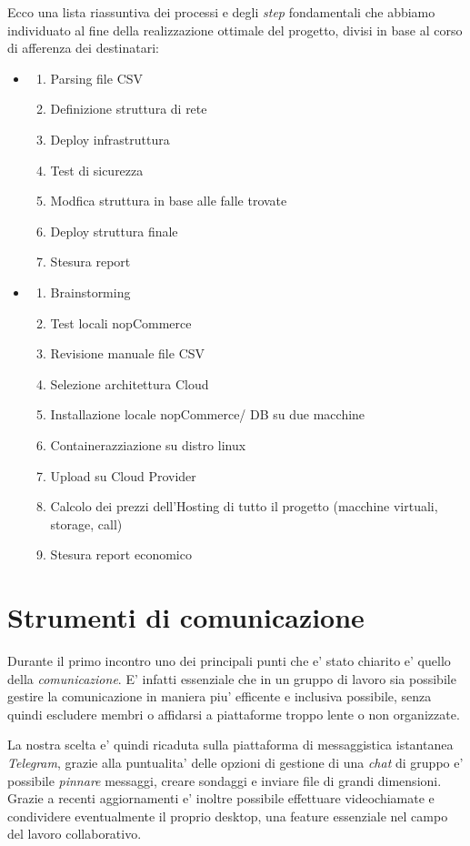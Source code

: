 \documentclass[a4paper]{report}
\begin{document}
	Ecco una lista riassuntiva dei processi e degli \emph{step} fondamentali che abbiamo individuato al fine della
	realizzazione ottimale del progetto, divisi in base al corso di afferenza dei destinatari:
	\begin{itemize}
		\item \begin{enumerate}
				\item Parsing file CSV
				\item Definizione struttura di rete
				\item Deploy infrastruttura
				\item Test di sicurezza
				\item Modfica struttura in base alle falle trovate
				\item Deploy struttura finale
				\item Stesura report
			\end{enumerate}
		\item \begin{enumerate}
				\item Brainstorming
				\item Test locali nopCommerce
				\item Revisione manuale file CSV
				\item Selezione architettura Cloud
				\item Installazione locale nopCommerce/ DB su due macchine
				\item Containerazziazione su distro linux
				\item Upload su Cloud Provider 
				\item Calcolo dei prezzi dell'Hosting di tutto il progetto (macchine virtuali, storage, call)
				\item Stesura report economico
			\end{enumerate}
	\end{itemize}
	\section{Strumenti di comunicazione}
		Durante il primo incontro uno dei principali punti che e' stato chiarito e' quello della \emph{comunicazione}.
		E' infatti essenziale che in un gruppo di lavoro sia possibile gestire la comunicazione in maniera piu'
		efficente e inclusiva possibile, senza quindi escludere membri o affidarsi a piattaforme troppo lente o non
		organizzate.
		
		La nostra scelta e' quindi ricaduta sulla piattaforma di messaggistica istantanea \emph{Telegram}, grazie alla
		puntualita' delle opzioni di gestione di una \emph{chat} di gruppo e' possibile \emph{pinnare} messaggi, creare
		sondaggi e inviare file di grandi dimensioni. Grazie a recenti aggiornamenti e' inoltre possibile effettuare
		videochiamate e condividere eventualmente il proprio desktop, una feature essenziale nel campo del lavoro
		collaborativo.
\end{document}
